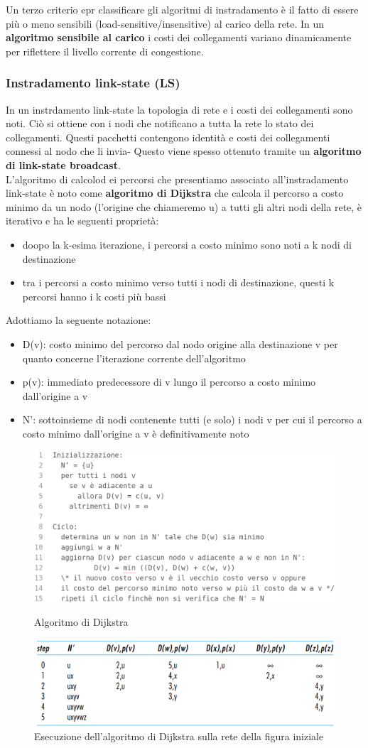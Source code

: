 \documentclass[11pt,a4paper]{article}
\begin{document}
Un terzo criterio epr classificare gli algoritmi di instradamento è il fatto di essere più o meno sensibili (load-sensitive/insensitive) al carico della rete. In un \textbf{algoritmo sensibile al carico} i costi dei collegamenti variano dinamicamente per riflettere il livello corrente di congestione.
\subsubsection{Instradamento link-state (LS)}
In un instrdamento link-state la topologia di rete e i costi dei collegamenti sono noti. Ciò si ottiene con i nodi che notificano a tutta la rete lo stato dei collegamenti. Questi pacchetti contengono identità e costi dei collegamenti connessi al nodo che li invia- Questo viene spesso ottenuto tramite un \textbf{algoritmo di link-state broadcast}.\\
L'algoritmo di calcolod ei percorsi che presentiamo associato all'instradamento link-state è noto come \textbf{algoritmo di Dijkstra} che calcola il percorso a costo minimo da un nodo (l'origine che chiameremo u) a tutti gli altri nodi della rete, è iterativo e ha le seguenti proprietà:
\begin{itemize}
	\item doopo la k-esima iterazione, i percorsi a costo minimo sono noti a k nodi di destinazione
	\item tra i percorsi a costo minimo verso tutti i nodi di destinazione, questi k percorsi hanno i k costi più bassi
\end{itemize}
Adottiamo la seguente notazione:
\begin{itemize}
	\item D(v): costo minimo del percorso dal nodo origine alla destinazione v per quanto concerne l'iterazione corrente dell'algoritmo
	\item p(v): immediato predecessore di v lungo il percorso a costo minimo dall'origine a v
	\item N': sottoinsieme di nodi contenente tutti (e solo) i nodi v per cui il percorso a costo minimo dall'origine a v è definitivamente noto
\end{itemize}
\begin{figure}
	\includegraphics[scale=0.4]{img/060.png}
	\caption{Algoritmo di Dijkstra}
	\includegraphics[scale=0.45]{img/061.png}
	\caption{Esecuzione dell'algoritmo di Dijkstra sulla rete della figura iniziale}
\end{figure}
\end{document}
